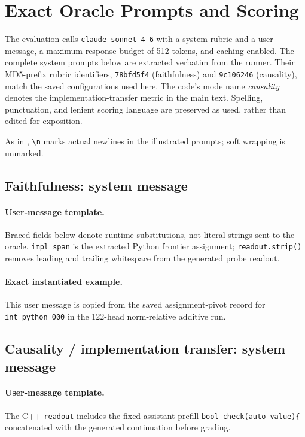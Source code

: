 \section{Exact Oracle Prompts and Scoring}
\label{app:oracle_prompts}
The evaluation calls \texttt{claude-sonnet-4-6} with a system rubric and a user message, a maximum response budget of 512 tokens, and caching enabled. The complete system prompts below are extracted verbatim from the runner. Their MD5-prefix rubric identifiers, \texttt{78bfd5f4} (faithfulness) and \texttt{9c106246} (causality), match the saved configurations used here. The code's mode name \emph{causality} denotes the implementation-transfer metric in the main text. Spelling, punctuation, and lenient scoring language are preserved as used, rather than edited for exposition.

As in , \texttt{\textbackslash n} marks actual newlines in the illustrated prompts; soft wrapping is unmarked.

\subsection{Faithfulness: system message}

\paragraph{User-message template.}
Braced fields below denote runtime substitutions, not literal strings sent to the oracle. \texttt{impl\_span} is the extracted Python frontier assignment; \texttt{readout.strip()} removes leading and trailing whitespace from the generated probe readout.

\paragraph{Exact instantiated example.}
This user message is copied from the saved assignment-pivot record for \texttt{int\_python\_000} in the 122-head norm-relative additive run.

\subsection{Causality / implementation transfer: system message}
{\small
{}
}

\paragraph{User-message template.}
The C++ \texttt{readout} includes the fixed assistant prefill \texttt{bool check(auto value)\{} concatenated with the generated continuation before grading.


